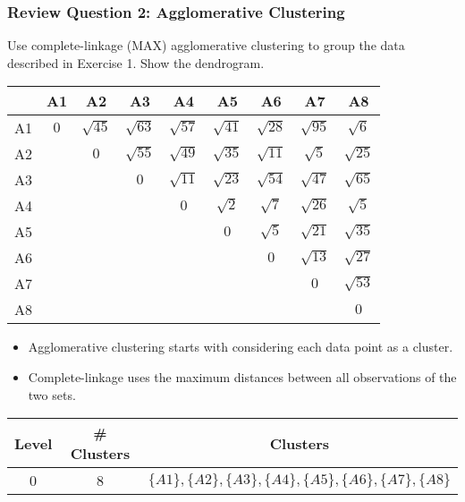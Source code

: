 \documentclass[aspectratio=169, 10pt]{beamer}
\begin{document}
\begin{frame}[t]
    \frametitle{Review Question 2: Agglomerative Clustering}
    \small
    Use complete-linkage (MAX) agglomerative clustering to group the data described in Exercise 1. Show the dendrogram.
    \begin{table}[]
        \scriptsize
        \begin{tabular}{c|cccccccc}
           & A1 & A2 & A3 & A4 & A5 & A6 & A7 & A8 \\ \hline
        A1 & $0$  & $\sqrt{45}$ & $\sqrt{63}$ & $\sqrt{57}$ & $\sqrt{41}$ & $\sqrt{28}$ & $\sqrt{95}$ & $\sqrt{6}$ \\
        A2 &    & $0$  & $\sqrt{55}$ & $\sqrt{49}$ & $\sqrt{35}$ & $\sqrt{11}$ & $\sqrt{5}$  & $\sqrt{25}$ \\
        A3 &    &    & $0$  & $\sqrt{11}$ & $\sqrt{23}$ & $\sqrt{54}$ & $\sqrt{47}$ & $\sqrt{65}$ \\
        A4 &    &    &    & $0$  & $\sqrt{2}$  & $\sqrt{7}$  & $\sqrt{26}$ & $\sqrt{5}$  \\
        A5 &    &    &    &    & $0$  & $\sqrt{5}$  & $\sqrt{21}$ & $\sqrt{35}$ \\
        A6 &    &    &    &    &    & $0$  & $\sqrt{13}$ & $\sqrt{27}$ \\
        A7 &    &    &    &    &    &    & $0$  & $\sqrt{53}$ \\
        A8 &    &    &    &    &    &    &    & $0$ \\
        \end{tabular}
    \end{table}

    \begin{itemize}
        \item Agglomerative clustering starts with considering each data point as a cluster.
        \item Complete-linkage uses the maximum distances between all observations of the two sets.
    \end{itemize}

    \begin{table}[]
        \scriptsize
        \begin{tabular}{c|c|c}
        Level & \# Clusters & Clusters \\ \hline
        0     & 8           & $\{A1\}, \{A2\}, \{A3\}, \{A4\}, \{A5\}, \{A6\}, \{A7\}, \{A8\}$\\
        \end{tabular}
    \end{table}
\end{frame}
\end{document}

